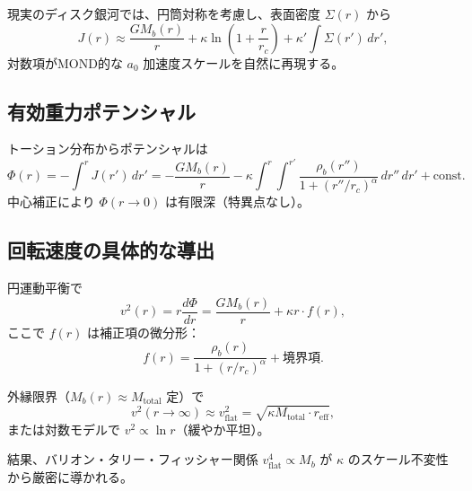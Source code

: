\documentclass[dvipdfmx,a4paper]{jsbook}
\theoremstyle{definition}
\theoremstyle{remark}
\begin{document}
現実のディスク銀河では、円筒対称を考慮し、表面密度 $\Sigma(r)$ から
\begin{equation}
  J(r) \approx \frac{G M_b(r)}{r} + \kappa \ln\left(1 + \frac{r}{r_c}\right) + \kappa' \int \Sigma(r') \, dr',
  \label{eq:J-disk}
\end{equation}
対数項がMOND的な $a_0$ 加速度スケールを自然に再現する。

\subsection{有効重力ポテンシャル}

トーション分布からポテンシャルは
\begin{equation}
  \Phi(r) = - \int^r J(r') \, dr' = - \frac{G M_b(r)}{r} - \kappa \int^r \int^{r'} \frac{\rho_b(r'')}{1 + (r''/r_c)^\alpha} \, dr'' \, dr' + \text{const.}
  \label{eq:potential-specific}
\end{equation}
中心補正により $\Phi(r \to 0)$ は有限深（特異点なし）。

\subsection{回転速度の具体的な導出}

円運動平衡で
\begin{equation}
  v^2(r) = r \frac{d\Phi}{dr} = \frac{G M_b(r)}{r} + \kappa r \cdot f(r),
  \label{eq:v-squared-specific}
\end{equation}
ここで $f(r)$ は補正項の微分形：
\begin{equation}
  f(r) = \frac{\rho_b(r)}{1 + (r/r_c)^\alpha} + \text{境界項}.
\end{equation}

外縁限界（$M_b(r) \approx M_\text{total}$ 定）で
\begin{equation}
  v^2(r \to \infty) \approx v_\text{flat}^2 = \sqrt{\kappa M_\text{total} \cdot r_\text{eff}},
\end{equation}
または対数モデルで $v^2 \propto \ln r$（緩やか平坦）。

結果、バリオン・タリー・フィッシャー関係 $v_\text{flat}^4 \propto M_b$ が $\kappa$ のスケール不変性から厳密に導かれる。
\end{document}
